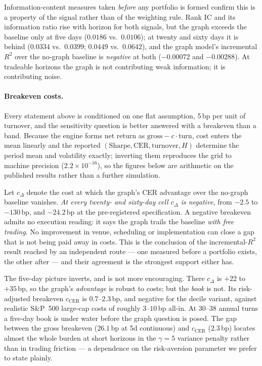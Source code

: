 Information-content measures taken \emph{before} any portfolio is formed
confirm this is a property of the signal rather than of the weighting rule.
Rank IC and its information ratio \citep{grinold2000active} rise with horizon
for both signals, but the graph exceeds the baseline only at five days ($0.0186$ vs.\ $0.0106$); at twenty and sixty
days it is behind ($0.0334$ vs.\ $0.0399$; $0.0449$ vs.\ $0.0642$), and the
graph model's incremental $R^2$ over the no-graph baseline is
\emph{negative} at both ($-0.00072$ and $-0.00288$). At tradeable horizons
the graph is not contributing weak information; it is contributing noise.

\paragraph{Breakeven costs.} Every statement above is conditioned on one flat
assumption, 5\,bp per unit of turnover, and the sensitivity question is better
answered with a breakeven than a band. Because the engine forms net return as
$\text{gross}-c\cdot\text{turn}$, cost enters the mean linearly and the
reported $(\text{Sharpe}, \text{CER}, \text{turnover}, H)$ determine the
period mean and volatility exactly; inverting them reproduces the grid to
machine precision ($2.2\times10^{-16}$), so the figures below are arithmetic
on the published results rather than a further simulation.

Let $c_{\Delta}$ denote the cost at which the graph's CER advantage over the
no-graph baseline vanishes. \emph{At every twenty- and sixty-day cell
$c_{\Delta}$ is negative}, from $-2.5$ to $-130$\,bp, and $-24.2$\,bp at the
pre-registered specification. A negative breakeven admits no execution
reading: it says the graph trails the baseline \emph{with free trading}. No
improvement in venue, scheduling or implementation can close a gap that is not
being paid away in costs. This is the conclusion of the incremental-$R^2$
result reached by an independent route --- one measured before a portfolio
exists, the other after --- and their agreement is the strongest support
either has.

The five-day picture inverts, and is not more encouraging. There
$c_{\Delta}$ is $+22$ to $+35$\,bp, so the graph's \emph{advantage} is robust
to costs; but the \emph{book} is not. Its risk-adjusted breakeven
$c_{\text{CER}}$ is $0.7$--$2.3$\,bp, and negative for the decile variant,
against realistic S\&P~500 large-cap costs of roughly $3$--$10$\,bp all-in. At
$30$--$38$ annual turns a five-day book is under water before the graph
question is posed. The gap between the gross breakeven ($26.1$\,bp at 5d
continuous) and $c_{\text{CER}}$ ($2.3$\,bp) locates almost the whole burden
at short horizons in the $\gamma=5$ variance penalty rather than in trading
friction --- a dependence on the risk-aversion parameter we prefer to state
plainly.

